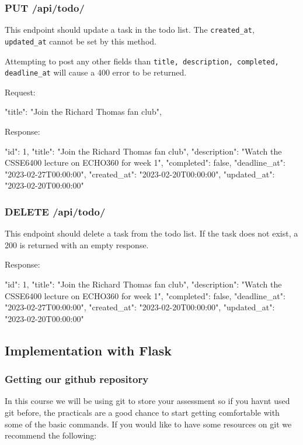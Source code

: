\documentclass{csse4400}
\begin{document}
\subsubsection{PUT /api/todo/}
This endpoint should update a task in the todo list. The \texttt{created\_at}, \texttt{updated\_at} cannot be set by this method.

Attempting to post any other fields than \texttt{title, description, completed, deadline\_at} will cause a 400 error to be returned.

Request:
\begin{code}[language=json]{}
{
  "title": "Join the Richard Thomas fan club",
}
\end{code}

Response:
\begin{code}[language=json]{}
{
  "id": 1,
  "title": "Join the Richard Thomas fan club",
  "description": "Watch the CSSE6400 lecture on ECHO360 for week 1",
  "completed": false,
  "deadline_at": "2023-02-27T00:00:00",
  "created_at": "2023-02-20T00:00:00",
  "updated_at": "2023-02-20T00:00:00"
}
\end{code}

\subsubsection{DELETE /api/todo/}
This endpoint should delete a task from the todo list. If the task does not exist, a 200 is returned with an empty response.

Response:
\begin{code}[language=json]{}
{
  "id": 1,
  "title": "Join the Richard Thomas fan club",
  "description": "Watch the CSSE6400 lecture on ECHO360 for week 1",
  "completed": false,
  "deadline_at": "2023-02-27T00:00:00",
  "created_at": "2023-02-20T00:00:00",
  "updated_at": "2023-02-20T00:00:00"
}
\end{code}


\subsection{Implementation with Flask}

\subsubsection{Getting our github repository}

In this course we will be using git to store your assessment so if you havnt used git before, the practicals are a good chance to start getting comfortable with some of the basic commands. If you would like to have some resources on git we recommend the following:
\end{document}
